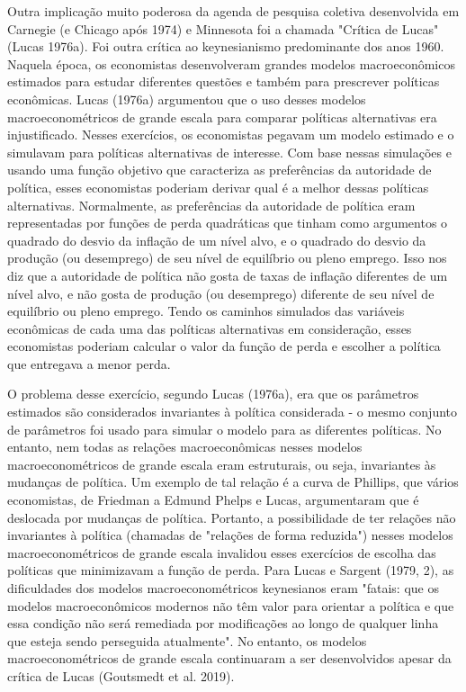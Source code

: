 \documentclass[12pt]{article}
\begin{document}
Outra implicação muito poderosa da agenda de pesquisa coletiva desenvolvida em Carnegie (e Chicago após 1974) e Minnesota foi a chamada "Crítica de Lucas" (Lucas 1976a). Foi outra crítica ao keynesianismo predominante dos anos 1960. Naquela época, os economistas desenvolveram grandes modelos macroeconômicos estimados para estudar diferentes questões e também para prescrever políticas econômicas. Lucas (1976a) argumentou que o uso desses modelos macroeconométricos de grande escala para comparar políticas alternativas era injustificado. Nesses exercícios, os economistas pegavam um modelo estimado e o simulavam para políticas alternativas de interesse. Com base nessas simulações e usando uma função objetivo que caracteriza as preferências da autoridade de política, esses economistas poderiam derivar qual é a melhor dessas políticas alternativas. Normalmente, as preferências da autoridade de política eram representadas por funções de perda quadráticas que tinham como argumentos o quadrado do desvio da inflação de um nível alvo, e o quadrado do desvio da produção (ou desemprego) de seu nível de equilíbrio ou pleno emprego. Isso nos diz que a autoridade de política não gosta de taxas de inflação diferentes de um nível alvo, e não gosta de produção (ou desemprego) diferente de seu nível de equilíbrio ou pleno emprego. Tendo os caminhos simulados das variáveis econômicas de cada uma das políticas alternativas em consideração, esses economistas poderiam calcular o valor da função de perda e escolher a política que entregava a menor perda.

O problema desse exercício, segundo Lucas (1976a), era que os parâmetros estimados são considerados invariantes à política considerada - o mesmo conjunto de parâmetros foi usado para simular o modelo para as diferentes políticas. No entanto, nem todas as relações macroeconômicas nesses modelos macroeconométricos de grande escala eram estruturais, ou seja, invariantes às mudanças de política. Um exemplo de tal relação é a curva de Phillips, que vários economistas, de Friedman a Edmund Phelps e Lucas, argumentaram que é deslocada por mudanças de política. Portanto, a possibilidade de ter relações não invariantes à política (chamadas de "relações de forma reduzida") nesses modelos macroeconométricos de grande escala invalidou esses exercícios de escolha das políticas que minimizavam a função de perda. Para Lucas e Sargent (1979, 2), as dificuldades dos modelos macroeconométricos keynesianos eram "fatais: que os modelos macroeconômicos modernos não têm valor para orientar a política e que essa condição não será remediada por modificações ao longo de qualquer linha que esteja sendo perseguida atualmente". No entanto, os modelos macroeconométricos de grande escala continuaram a ser desenvolvidos apesar da crítica de Lucas (Goutsmedt et al. 2019).
\end{document}
